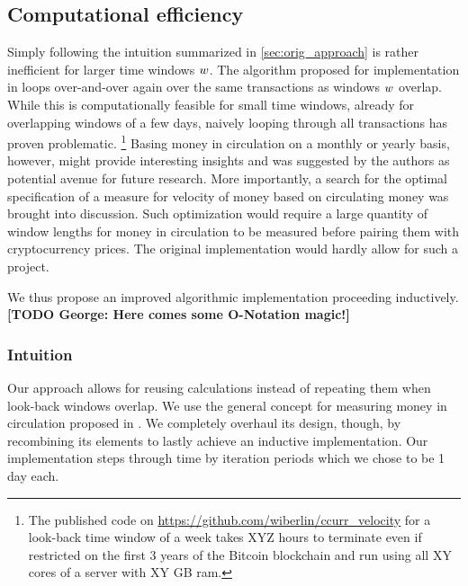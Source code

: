 \subsection{Computational efficiency}
\label{sec:effi}%
Simply following the intuition summarized in \ref{sec:orig_approach} is rather inefficient for larger time windows \({w}\). %
The algorithm proposed for implementation in \cite{pernice2019cryptocurrencies} loops over-and-over again over the same transactions as windows \({w}\) overlap. %
While this is computationally feasible for small time windows, already for overlapping windows of a few days, naively looping through all transactions has proven problematic.%
\footnote{The published code on \url{https://github.com/wiberlin/ccurr_velocity} for a look-back time window of a week takes XYZ hours to terminate even if restricted on the first 3 years of the Bitcoin blockchain and run using all XY cores of a server with XY GB ram.} %
Basing money in circulation on a monthly or yearly basis, however, might provide interesting insights and was suggested by the authors as potential avenue for future research. %
More importantly, a search for the optimal specification of a measure for velocity of money based on circulating money was brought into discussion. %
Such optimization would require a large quantity of window lengths for money in circulation to be measured before pairing them with cryptocurrency prices. %
The original implementation would hardly allow for such a project. %

We thus propose an improved algorithmic implementation proceeding inductively. %
\textbf{[TODO George: Here comes some O-Notation magic!]}

\subsubsection{Intuition}
\label{sec:novel_impl_intuition}%
Our approach allows for reusing calculations instead of repeating them when look-back windows overlap. %
We use the general concept for measuring money in circulation proposed in \cite{pernice2019cryptocurrencies}. %
We completely overhaul its design, though, by recombining its elements to lastly achieve an inductive implementation. %
Our implementation steps through time by iteration periods which we chose to be 1 day each. %

